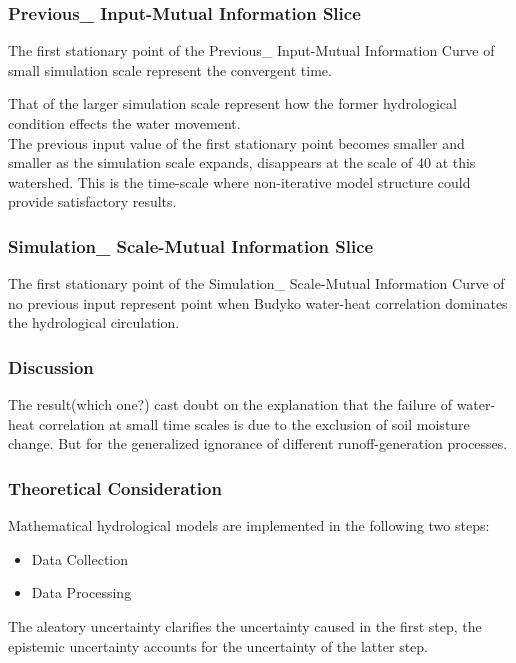 \documentclass{beamer}
\begin{document}
\begin{CJK}{UTF8}{gkai}
\begin{frame}
\frametitle{Previous\_ Input-Mutual Information Slice}
The first stationary point of the Previous\_ Input-Mutual Information Curve of small simulation scale represent the convergent time. 

That of the larger simulation scale represent how the former hydrological condition effects the water movement.
\\

The previous input value of the first stationary point becomes smaller and smaller as the simulation scale expands, disappears at the scale of 40 at this watershed. This is the time-scale where non-iterative model structure could provide satisfactory results.
\end{frame}

\begin{frame}
\frametitle{Simulation\_ Scale-Mutual Information Slice}
The first stationary point of the Simulation\_ Scale-Mutual Information Curve of no previous input represent point when Budyko water-heat correlation dominates the hydrological circulation.
\end{frame}






\begin{frame}
\frametitle{Discussion}
The result(which one?) cast doubt on the explanation that the failure of water-heat correlation at small time scales is due to the exclusion of soil moisture change.
But for the generalized ignorance of different runoff-generation processes.
\end{frame}


\begin{frame}
\frametitle{Theoretical Consideration}
Mathematical hydrological models are implemented in the following two steps:
\begin{itemize}
\item Data Collection
\item Data Processing
\end{itemize}
The aleatory uncertainty clarifies the uncertainty caused in the first step, the epistemic uncertainty accounts for the uncertainty of the latter step. 
\end{frame}
 

 
\end{CJK}
\end{document}

